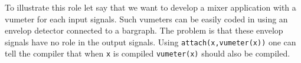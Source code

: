 To illustrate this role let say that we want to develop a mixer application with a vumeter for each input signals. Such vumeters can be easily coded in \faust using an envelop detector connected to a bargraph. The problem is that these envelop signals have no role in the output signals. Using \lstinline'attach(x,vumeter(x))' one can tell the compiler that when \lstinline'x' is compiled \lstinline'vumeter(x)' should also be compiled. 


